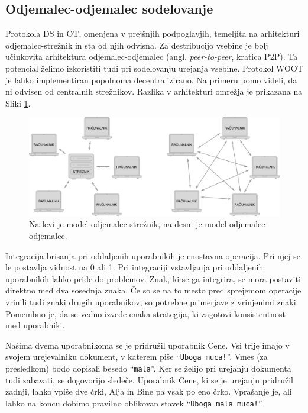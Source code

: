 \documentclass[a4paper, 12pt, twoside]{book}
\begin{document}
\subsection{Odjemalec-odjemalec sodelovanje}

Protokola DS in OT, omenjena v prejšnjih podpoglavjih, temeljita na arhitekturi \linebreak odjemalec-strežnik in sta od njih odvisna. Za destribucijo vsebine je bolj učinkovita arhitektura odjemalec-odjemalec (angl. \textit{peer-to-peer}, kratica P2P). Ta potencial želimo izkoristiti tudi pri sodelovanju urejanja vsebine. Protokol WOOT je lahko implementiran popolnoma decentralizirano. Na primeru bomo videli, da ni odvisen od centralnih strežnikov. Razlika v arhitekturi omrežja je prikazana na Sliki \ref{p2p_c-s}.

\begin{figure}[placement h]
\begin{center}
\includegraphics[width=16cm]{img/p2p_c-s.pdf}
\end{center}
\caption{Na levi je model odjemalec-strežnik, na desni je model odjemalec-odjemalec.}
\label{p2p_c-s}
\end{figure}

Integracija brisanja pri oddaljenih uporabnikih je enostavna operacija. Pri njej se le postavlja vidnost na 0 ali 1. Pri integraciji vstavljanja pri oddaljenih uporabnikih lahko pride do problemov. Znak, ki se ga integrira, se mora postaviti direktno med dva sosednja znaka. Če so se na to mesto pred sprejemom operacije vrinili tudi znaki drugih uporabnikov, so potrebne primerjave z vrinjenimi znaki. Pomembno je, da se vedno izvede enaka strategija, ki zagotovi konsistentnost med uporabniki.

Našima dvema uporabnikoma se je pridružil uporabnik Cene. Vsi trije imajo v svojem urejevalniku dokument, v katerem piše “{\tt Uboga muca!}”. Vmes (za presledkom) bodo dopisali besedo “{\tt mala}”. Ker se želijo pri urejanju dokumenta tudi zabavati, se dogovorijo sledeče. Uporabnik Cene, ki se je urejanju pridružil zadnji, lahko vpiše dve črki, Alja in Bine pa vsak po eno črko. Vprašanje je, ali lahko na koncu dobimo pravilno oblikovan stavek “{\tt Uboga mala muca!}”.
\end{document}
